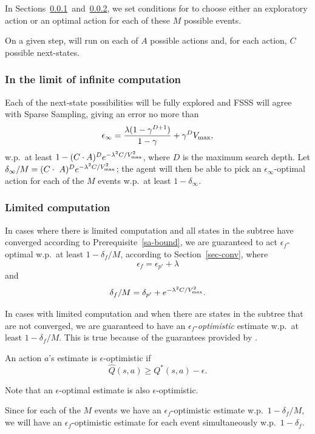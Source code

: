 In Sections~\ref{sec:inf}~and~\ref{sec:fin}, we set conditions for  to choose either an exploratory action or an optimal action for each of these $M$ possible events.

On a given step,  will run  on each of $A$ possible actions and, for each action, $C$ possible next-states.


\subsubsection{In the limit of infinite computation}
\label{sec:inf}

Each of the next-state possibilities will be fully explored and FSSS will agree with Sparse Sampling, giving an error no more than 
$$\epsilon_\infty = \frac {\lambda(1-\gamma^{D+1})} {1-\gamma}+\gamma^DV_{\rm max},$$
w.p.\ at least $1-(C\cdot A)^D e^{-\lambda^2C/V_{\rm max}^2}$, where $D$ is the maximum search depth. Let $\delta_\infty/M=(C\cdot~A)^De^{-\lambda^2C/V_{\rm max}^2}$; the agent will then be able to pick an $\epsilon_\infty$-optimal action for each of the $M$ events w.p.\ at least $1-\delta_\infty$.

\subsubsection{Limited computation}
\label{sec:fin}

In cases where there is limited computation and all states in the subtree have converged according to Prerequisite~\ref{sa-bound}, we are guaranteed to act $\epsilon_f$-optimal w.p.\ at least $1 - \delta_f/M$, according to Section~\ref{sec-conv}, where
$$\epsilon_f = \epsilon_{p'}+\lambda$$
and
$$\delta_f/M = \delta_{p'} + e^{-\lambda^2 C / {V_{\rm max}^2}}.$$

In cases with limited computation and when there are states in the subtree that are not converged, we are guaranteed to have an $\epsilon_f$-\emph{optimistic} estimate w.p.\ at least $1-\delta_f/M$. This is true because of the guarantees provided by .

An action $a$'s estimate is $\epsilon$-optimistic if
$$\hat Q(s, a) \geq Q^*(s, a) - \epsilon.$$

Note that an $\epsilon$-optimal estimate is also $\epsilon$-optimistic.

Since for each of the $M$ events we have an $\epsilon_f$-optimistic estimate w.p.\ $1-\delta_f/M$, we will have an $\epsilon_f$-optimistic estimate for each event simultaneously w.p.\ $1-\delta_f$.

